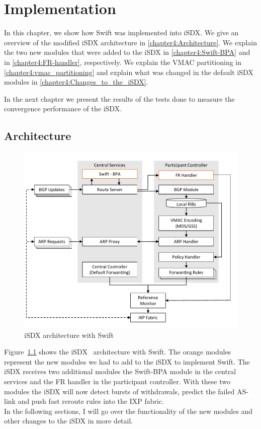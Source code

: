 \chapter{\label{chapter4}Implementation}

In this chapter, we show how Swift was implemented into iSDX. We give an overview of the modified iSDX architecture in \ref{chapter4:Architecture}. We explain the two new modules that were added to the iSDX in \ref{chapter4:Swift-BPA} and in \ref{chapter4:FR-handler}, respectively. We explain the VMAC partitioning in \ref{chapter4:vmac_partitioning} and explain what was changed in the default iSDX modules in \ref{chapter4:Changes_to_the_iSDX}.

In the next chapter we present the results of the tests done to measure the convergence performance of the iSDX.

\section{\label{chapter4:Architecture}Architecture}

\begin{figure}[h]
\center
\includegraphics[scale = 0.7]{Figures/design_sdx_swift_cropped.pdf}
\caption{iSDX architecture with Swift}
\label{fig:isdx_architecture_with_swift}
\end{figure}

Figure~\ref{fig:isdx_architecture_with_swift} shows the iSDX~\cite{feamster2013sdx} architecture with Swift. The orange modules represent the new modules we had to add to the iSDX to implement Swift. The iSDX receives two additional modules the Swift-BPA module in the central services and the FR handler in the participant controller. With these two modules the iSDX will now detect bursts of withdrawals, predict the failed AS-link and push fast reroute rules into the IXP fabric. \\
In the following sections, I will go over the functionality of the new modules and other changes to the iSDX in more detail.

